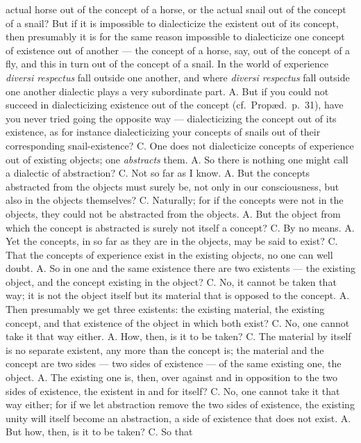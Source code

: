 \documentclass[12pt,a4paper]{book}
\begin{document}
actual horse out of the concept of a horse, or the actual snail out of the
concept of a snail? But if it is impossible to dialecticize the existent out of
its concept, then presumably it is for the same reason impossible to
dialecticize one concept of existence out of another --- the concept of a
horse, say, out of the concept of a fly, and this in turn out of the concept of
a snail. In the world of experience \textit{diversi respectus} fall outside one
another, and where \textit{diversi respectus} fall outside one another
dialectic plays a very subordinate part. A. But if you could not succeed in
dialecticizing existence out of the concept (cf.\ Propæd.\ p.~31), have you
never tried going the opposite way --- dialecticizing the concept out
of its existence, as for instance dialecticizing your concepts of snails out of
their corresponding snail-existence? C. One does not dialecticize concepts of
experience out of existing objects; one \emph{abstracts} them. A. So there is
nothing one might call a dialectic of abstraction? C. Not so far as I know.
A. But the concepts abstracted from the objects must surely be, not only in our
consciousness, but also in the objects themselves? C. Naturally; for if the
concepts were not in the objects, they could not be abstracted from the
objects. A. But the object from which the concept is abstracted is surely not
itself a concept? C. By no means. A. Yet the concepts, in so far as they are in
the objects, may be said to exist? C. That the concepts of experience exist in
the existing objects, no one can well doubt. A. So in one and the same
existence there are two existents --- the existing object, and the concept
existing in the object? C. No, it cannot be taken that way; it is not the
object itself but its material that is opposed to the concept. A. Then
presumably we get three existents: the existing material, the existing concept,
and that existence of the object in which both exist? C. No, one cannot take it
that way either. A. How, then, is it to be taken? C. The material by itself is
no separate existent, any more than the concept is; the material and the
concept are two sides --- two sides of existence --- of the same existing one,
the object. A. The existing one is, then, over against and in opposition to the
two sides of existence, the existent in and for itself? C. No, one cannot take
it that way either; for if we let abstraction remove the two sides of
existence, the existing unity will itself become an abstraction, a side of
existence that does not exist. A. But how, then, is it to be taken? C. So that
\end{document}

